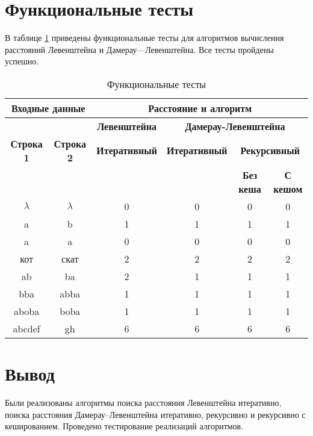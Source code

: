 \clearpage


\section{Функциональные тесты}

В таблице \ref{tbl:func_tests} приведены функциональные тесты для алгоритмов вычисления расстояний Левенштейна и Дамерау—Левенштейна. Все тесты пройдены успешно.

\begin{table}[ht]
	\small
	\begin{center}
		\begin{threeparttable}
		\caption{Функциональные тесты}
		\label{tbl:func_tests}
		\begin{tabular}{|c|c|c|c|c|c|}
			\hline
			\multicolumn{2}{|c|}{\bfseries Входные данные}
			& \multicolumn{4}{c|}{\bfseries Расстояние и алгоритм} \\ 
			\hline 
			&
			& \multicolumn{1}{c|}{\bfseries Левенштейна} 
			& \multicolumn{3}{c|}{\bfseries Дамерау-Левенштейна} \\ \cline{3-6}
			
			\bfseries Строка 1 & \bfseries Строка 2 & \bfseries Итеративный & \bfseries Итеративный
			
			& \multicolumn{2}{c|}{\bfseries Рекурсивный} \\ \cline{5-6}
			& & & & \bfseries Без кеша & \bfseries С кешом \\
			\hline
			$\lambda$ & $\lambda$ & 0 & 0 & 0 & 0 \\
			\hline
			a & b & 1 & 1 & 1 & 1 \\
			\hline
			a & a & 0 & 0 & 0 & 0 \\
			\hline
			кот & скат & 2 & 2 & 2 & 2 \\
			\hline
			ab & ba & 2 & 1 & 1 & 1 \\
			\hline
			bba & abba & 1 & 1 & 1 & 1 \\
			\hline
			aboba & boba & 1 & 1 & 1 & 1 \\
			\hline
			abcdef & gh & 6 & 6 & 6 & 6 \\
			\hline
			
		\end{tabular}	
		\end{threeparttable}
	\end{center}
\end{table}

\section*{Вывод}

Были реализованы алгоритмы поиска расстояния Левенштейна итеративно, поиска расстояния Дамерау–Левенштейна итеративно, рекурсивно и рекурсивно с кешированием. Проведено тестирование реализаций алгоритмов.
